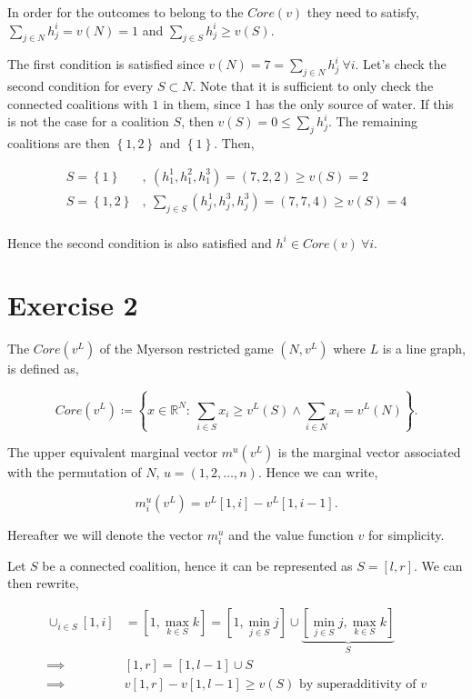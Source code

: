 \documentclass[american]{scrartcl}
\newcommand{\set}[1]{\left\{#1\right\}}
\newcommand{\Real}{\mathbb{R}}
\begin{document}
In order for the outcomes to belong to the $Core(v)$ they need to satisfy, $\sum_{j \in N} h_j^i = v(N) = 1$ and $\sum_{j \in S}  h_j^i \geq v(S)$.

The first condition is satisfied since $v(N) = 7 = \sum_{j \in N} h_j^i \ \forall i$. Let's check the second condition for every $S \subset N$. Note that it is sufficient to only check the connected coalitions with $1$ in them, since $1$ has the only source of water. If this is not the case for a coalition $S$, then $v(S) = 0 \leq \sum_{j} h_j^i$. The remaining coalitions are then $\set{1, 2}$ and $\set{1}$. Then,

\begin{equation}
    \begin{split}
        S = \set{1}&, \ (h^1_1, h^2_1, h^3_1) = (7, 2, 2) \geq v(S) = 2 \\
        S = \set{1, 2}&, \ \sum_{j \in S} (h^1_j, h^3_j, h^3_j) = (7, 7, 4) \geq v(S) = 4 \\
    \end{split}
\end{equation}


Hence the second condition is also satisfied and $h^i \in Core(v) \ \forall i$.

\section*{Exercise 2}

The $Core(v^L)$ of the Myerson restricted game $(N, v^L)$ where $L$ is a line graph, is defined as,

\begin{equation}
    Core(v^L) \coloneqq \set{x \in \Real^N: \ \sum_{i \in S} x_i \geq v^L(S) \land \sum_{i \in N} x_i = v^L(N)}.
\end{equation}

The upper equivalent marginal vector $m^u(v^L)$ is the marginal vector associated with the permutation of $N$, $u = (1, 2, \ldots, n)$. Hence we can write,

\begin{equation} \label{mu_def}
    m^u_i(v^L) = v^L[1, i] - v^L[1, i-1].
\end{equation}

Hereafter we will denote the vector $m^u_i$ and the value function $v$ for simplicity.

Let $S$ be a connected coalition, hence it can be represented as $S=[l, r]$. We can then rewrite,

\begin{equation} \label{conn_res}
    \begin{split}
        \cup_{i \in S} [1, i] &= [1, \max_{k \in S} k] = [1, \min_{j \in S}j] \cup \underbrace{[\min_{j \in S}j, \max_{k \in S}k]}_{S}\\
        \implies & [1, r] = [1, l - 1] \cup S \\
        \implies & v[1, r] - v[1, l - 1]  \geq  v(S) \text{ by superadditivity of } v \\
    \end{split}
\end{equation}
\end{document}
